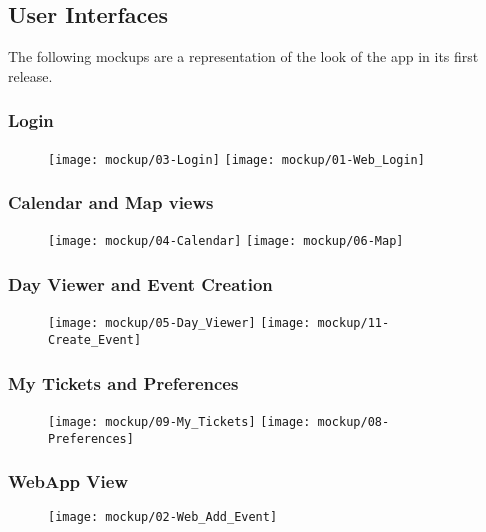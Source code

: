 \subsection{User Interfaces}
\label{subsect:User Interfaces}
	The following mockups are a representation of the look of the app in its first release.
	\subsubsection{Login}
	\begin{figure}[H]
	\texttt{[image: mockup/03-Login]}
	\vspace{2.5cm}
	\texttt{[image: mockup/01-Web\_Login]}
	\centering 
	\end{figure}
	
	\subsubsection{Calendar and Map views}
	\begin{figure}[H]
	\texttt{[image: mockup/04-Calendar]}
	\hspace{2.5cm}
	\texttt{[image: mockup/06-Map]}
	\centering 
	\end{figure}
	
	\subsubsection{Day Viewer and Event Creation}
	\begin{figure}[H]
	\texttt{[image: mockup/05-Day\_Viewer]}
	\hspace{2.5cm}
	\texttt{[image: mockup/11-Create\_Event]}
	\centering 
	\end{figure}
	
	\subsubsection{My Tickets and Preferences}
	\begin{figure}[H]
	\texttt{[image: mockup/09-My\_Tickets]}
	\hspace{2.5cm}
	\texttt{[image: mockup/08-Preferences]}
	\centering 
	\end{figure}
	
	\subsubsection{WebApp View}
	\begin{figure}[H]
	\texttt{[image: mockup/02-Web\_Add\_Event]}
	\centering 
	\end{figure}
